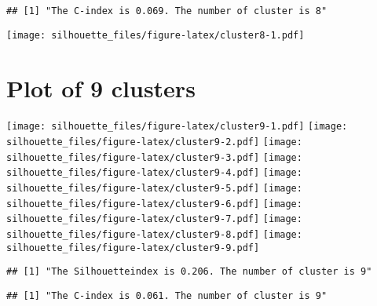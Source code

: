 \documentclass[
]{article}
\begin{document}
\begin{verbatim}
## [1] "The C-index is 0.069. The number of cluster is 8"
\end{verbatim}

\texttt{[image: silhouette\_files/figure-latex/cluster8-1.pdf]}

\newpage

\hypertarget{plot-of-9-clusters}{%
\section{Plot of 9 clusters}\label{plot-of-9-clusters}}

\texttt{[image: silhouette\_files/figure-latex/cluster9-1.pdf]}
\texttt{[image: silhouette\_files/figure-latex/cluster9-2.pdf]}
\texttt{[image: silhouette\_files/figure-latex/cluster9-3.pdf]}
\texttt{[image: silhouette\_files/figure-latex/cluster9-4.pdf]}
\texttt{[image: silhouette\_files/figure-latex/cluster9-5.pdf]}
\texttt{[image: silhouette\_files/figure-latex/cluster9-6.pdf]}
\texttt{[image: silhouette\_files/figure-latex/cluster9-7.pdf]}
\texttt{[image: silhouette\_files/figure-latex/cluster9-8.pdf]}
\texttt{[image: silhouette\_files/figure-latex/cluster9-9.pdf]}

\begin{verbatim}
## [1] "The Silhouetteindex is 0.206. The number of cluster is 9"
\end{verbatim}

\begin{verbatim}
## [1] "The C-index is 0.061. The number of cluster is 9"
\end{verbatim}
\end{document}
